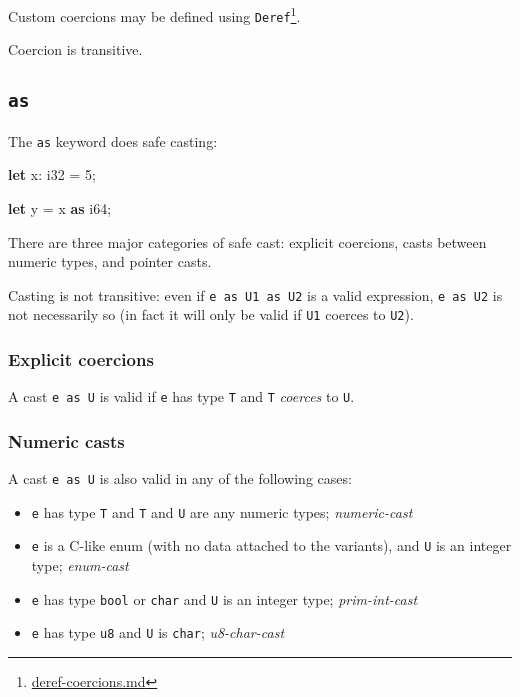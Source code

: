 \documentclass[a4paper,]{book}
\newenvironment{Shaded}{\begin{snugshade}}{\end{snugshade}}
\newcommand{\KeywordTok}[1]{\textcolor[rgb]{0.13,0.29,0.53}{\textbf{{#1}}}}
\newcommand{\DataTypeTok}[1]{\textcolor[rgb]{0.13,0.29,0.53}{{#1}}}
\newcommand{\DecValTok}[1]{\textcolor[rgb]{0.00,0.00,0.81}{{#1}}}
\newcommand{\NormalTok}[1]{{#1}}
\renewcommand{\href}[2]{#2\footnote{\url{#1}}}
\providecommand{\tightlist}{%
  \setlength{\itemsep}{0pt}\setlength{\parskip}{0pt}}
\begin{document}
Custom coercions may be defined using
\href{deref-coercions.md}{\texttt{Deref}}.

Coercion is transitive.

\subsection{\texorpdfstring{\texttt{as}}{as}}\label{as}

The \texttt{as} keyword does safe casting:

\begin{Shaded}
\begin{Highlighting}[]
\KeywordTok{let} \NormalTok{x: }\DataTypeTok{i32} \NormalTok{= }\DecValTok{5}\NormalTok{;}

\KeywordTok{let} \NormalTok{y = x }\KeywordTok{as} \DataTypeTok{i64}\NormalTok{;}
\end{Highlighting}
\end{Shaded}

There are three major categories of safe cast: explicit coercions, casts
between numeric types, and pointer casts.

Casting is not transitive: even if \texttt{e\ as\ U1\ as\ U2} is a valid
expression, \texttt{e\ as\ U2} is not necessarily so (in fact it will
only be valid if \texttt{U1} coerces to \texttt{U2}).

\hypertarget{explicit-coercions}{\subsubsection{Explicit
coercions}\label{explicit-coercions}}

A cast \texttt{e\ as\ U} is valid if \texttt{e} has type \texttt{T} and
\texttt{T} \emph{coerces} to \texttt{U}.

\subsubsection{Numeric casts}\label{numeric-casts}

A cast \texttt{e\ as\ U} is also valid in any of the following cases:

\begin{itemize}
\tightlist
\item
  \texttt{e} has type \texttt{T} and \texttt{T} and \texttt{U} are any
  numeric types; \emph{numeric-cast}
\item
  \texttt{e} is a C-like enum (with no data attached to the variants),
  and \texttt{U} is an integer type; \emph{enum-cast}
\item
  \texttt{e} has type \texttt{bool} or \texttt{char} and \texttt{U} is
  an integer type; \emph{prim-int-cast}
\item
  \texttt{e} has type \texttt{u8} and \texttt{U} is \texttt{char};
  \emph{u8-char-cast}
\end{itemize}
\end{document}
